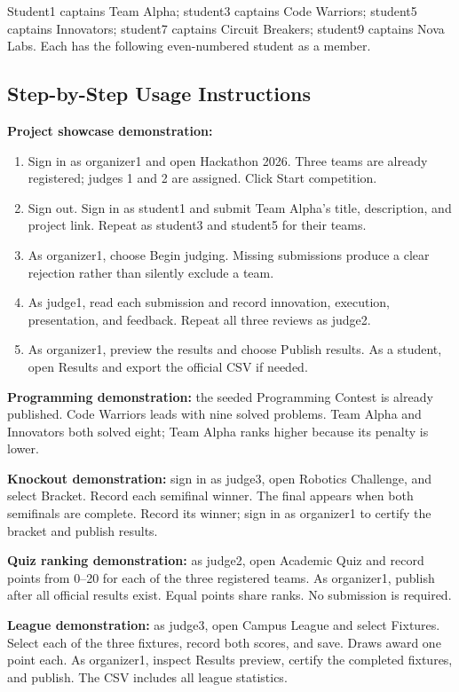 \documentclass[12pt]{article}
\begin{document}
Student1 captains Team Alpha; student3 captains Code Warriors; student5 captains Innovators; student7 captains Circuit Breakers; student9 captains Nova Labs. Each has the following even-numbered student as a member.
\subsection{Step-by-Step Usage Instructions}
\textbf{Project showcase demonstration:}
\begin{enumerate}
\item Sign in as organizer1 and open Hackathon 2026. Three teams are already registered; judges 1 and 2 are assigned. Click Start competition.
\item Sign out. Sign in as student1 and submit Team Alpha's title, description, and project link. Repeat as student3 and student5 for their teams.
\item As organizer1, choose Begin judging. Missing submissions produce a clear rejection rather than silently exclude a team.
\item As judge1, read each submission and record innovation, execution, presentation, and feedback. Repeat all three reviews as judge2.
\item As organizer1, preview the results and choose Publish results. As a student, open Results and export the official CSV if needed.
\end{enumerate}
\textbf{Programming demonstration:} the seeded Programming Contest is already published. Code Warriors leads with nine solved problems. Team Alpha and Innovators both solved eight; Team Alpha ranks higher because its penalty is lower.

\textbf{Knockout demonstration:} sign in as judge3, open Robotics Challenge, and select Bracket. Record each semifinal winner. The final appears when both semifinals are complete. Record its winner; sign in as organizer1 to certify the bracket and publish results.

\textbf{Quiz ranking demonstration:} as judge2, open Academic Quiz and record points from 0--20 for each of the three registered teams. As organizer1, publish after all official results exist. Equal points share ranks. No submission is required.

\textbf{League demonstration:} as judge3, open Campus League and select Fixtures. Select each of the three fixtures, record both scores, and save. Draws award one point each. As organizer1, inspect Results preview, certify the completed fixtures, and publish. The CSV includes all league statistics.
\end{document}
